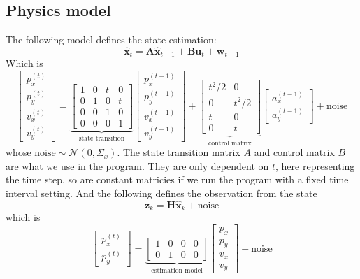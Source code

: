 \documentclass[12pt]{article}
\begin{document}
	\subsection{Physics model}\label{sub:model}
	The following model defines the state estimation:
	\begin{equation}
		\hat{\mathbf{x}}_t=\mathbf{A}\hat{\mathbf{x}}_{t-1}+\mathbf{B}\mathbf{u}_t+\mathbf{w}_{t-1}
	\end{equation}
	Which is
	\begin{equation}
		\begin{bmatrix}
			p^{(t)}_x \\ p^{(t)}_y \\ v^{(t)}_x \\ v^{(t)}_y
		\end{bmatrix}=
		\underbrace{\begin{bmatrix}
			1 & 0 & t & 0 \\
			0 & 1 & 0 & t \\
			0 & 0 & 1 & 0 \\
			0 & 0 & 0 & 1
		\end{bmatrix}}_{\text{state transition}}
		\begin{bmatrix}
			p^{(t-1)}_x \\ p^{(t-1)}_y \\ v^{(t-1)}_x \\ v^{(t-1)}_y
		\end{bmatrix}+
		\underbrace{\begin{bmatrix}
			t^2/2 & 0 \\
			0 & t^2/2 \\
			t & 0 \\
			0 & t
		\end{bmatrix}}_{\text{control matrix}}
		\begin{bmatrix}
			a^{(t-1)}_x \\ a^{(t-1)}_y
		\end{bmatrix}+\text{noise}
	\end{equation}
	whose $\text{noise}\sim\mathcal{N}\left(0,\Sigma_x\right)$. The state transition matrix $A$ and control matrix $B$ are what we use in the program. They are only dependent on $t$, here representing the time step, so are constant matricies if we run the program with a fixed time interval setting. And the following defines the observation from the state
	\begin{equation}
		\mathbf{z}_k=\mathbf{H}\hat{\mathbf{x}}_k+\text{noise}
	\end{equation}
	which is
	\begin{equation}
		\begin{bmatrix}
			p^{(t)}_x \\ p^{(t)}_y
		\end{bmatrix}=
		\underbrace{\begin{bmatrix}
			1 & 0 & 0 & 0 \\
			0 & 1 & 0 & 0
		\end{bmatrix}}_{\text{estimation model}}
		\begin{bmatrix}
			p_x \\ p_y \\ v_x \\ v_y
		\end{bmatrix}+\text{noise}
	\end{equation}
\end{document}
